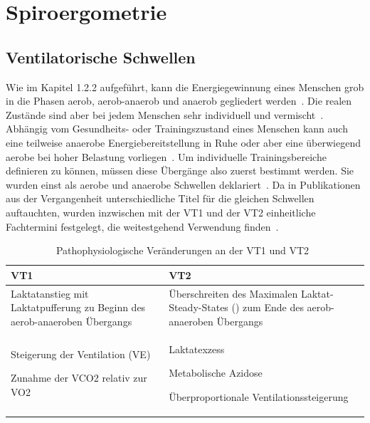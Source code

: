 \section{Spiroergometrie}
%
\subsection{Ventilatorische Schwellen}
%
Wie im Kapitel 1.2.2 aufgeführt, kann die Energiegewinnung eines Menschen grob in die Phasen aerob, aerob-anaerob und anaerob gegliedert werden~\cite{Antonutto.1995}. Die realen Zustände sind aber bei jedem Menschen sehr individuell und vermischt~\cite{Moosburger.1995}. Abhängig vom Gesundheits- oder Trainingszustand eines Menschen kann auch eine teilweise anaerobe Energiebereitstellung in Ruhe oder aber eine überwiegend aerobe bei hoher Belastung vorliegen~\cite{Skinner.1980}. Um individuelle Trainingsbereiche definieren zu können, müssen diese Übergänge also zuerst bestimmt werden. Sie wurden einst als aerobe und anaerobe Schwellen deklariert~\cite{Wasserman.1973}. Da in Publikationen aus der Vergangenheit unterschiedliche Titel für die gleichen Schwellen auftauchten, wurden inzwischen mit der \gls{VT1} und der \gls{VT2} einheitliche Fachtermini festgelegt, die weitestgehend Verwendung finden~\cite{Westhoff.2012}.
\begin{table}[H]
	\centering
	\caption[Pathophysiologische Veränderungen an der VT1 und VT2]{Pathophysiologische Veränderungen an der VT1 und VT2~\cite{Westhoff.2012}}
	\medskip
	\begin{tabularx}{\textwidth}{X X}
		\toprule
		\textbf{VT1} & \textbf{VT2} \\
		\midrule
		\midrule
		Laktatanstieg mit Laktatpufferung zu Beginn des aerob-anaeroben Übergangs & Überschreiten des Maximalen Laktat-Steady-States (\myglsgen{MLSS}) zum Ende des aerob-anaeroben Übergangs \\
		\begin{titemize}
			\item Steigerung der Ventilation (\gls{VE})
			\item Zunahme der \gls{VCO2} relativ zur \gls{VO2}
		\end{titemize}
		&\begin{titemize}
			\item Laktatexzess
			\item Metabolische Azidose
			\item Überproportionale Ventilationssteigerung
		\end{titemize}\\
		\bottomrule
	\end{tabularx}
	\label{tab:tabelle1}
\end{table}
